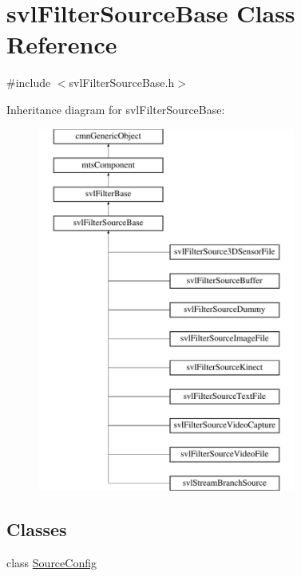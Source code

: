 \hypertarget{classsvl_filter_source_base}{}\section{svl\+Filter\+Source\+Base Class Reference}
\label{classsvl_filter_source_base}


{\ttfamily \#include $<$svl\+Filter\+Source\+Base.\+h$>$}

Inheritance diagram for svl\+Filter\+Source\+Base\+:\begin{figure}[H]
\begin{center}
\leavevmode
\includegraphics[height=12.000000cm]{df/db9/classsvl_filter_source_base}
\end{center}
\end{figure}
\subsection*{Classes}
\begin{DoxyCompactItemize}
\item 
class \hyperlink{classsvl_filter_source_base_1_1_source_config}{Source\+Config}
\end{DoxyCompactItemize}
